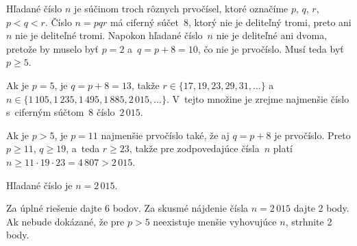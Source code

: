 {%
Hľadané číslo $n$ je súčinom troch rôznych prvočísel, ktoré označíme $p$, $q$, $r$, ${p<q<r}$.
Číslo $n=pqr$ má ciferný súčet~$8$, ktorý nie je deliteľný tromi, preto ani $n$ nie je deliteľné
tromi. Napokon hľadané číslo~$n$ nie je deliteľné ani dvoma, pretože by
muselo byť $p=2$ a~$q=p+8=10$, čo nie je prvočíslo. Musí teda byť $p\ge 5$.

Ak je $p=5$, je $q=p+8=13$, takže $r\in\{17, 19, 23, 29, 31, {\dots}\}$ a~$n\in\{1\,105,\allowbreak
1\,235, 1\,495, 1\,885, 2\,015, {\dots}\}$. V~tejto množine je zrejme najmenšie
číslo s~ciferným súčtom~$8$ číslo~$2\,015$.

Ak je $p>5$, je $p=11$ najmenšie prvočíslo také, že aj $q=p+8$ je prvočíslo. Preto
$p\ge11$, $q\ge19$, a~teda $r\ge23$, takže pre zodpovedajúce čísla~$n$
platí $n\ge11\cdot 19\cdot 23 = 4\,807 > 2\,015$.

Hľadané číslo je $n=2\,015$.


\nobreak\medskip\petit\noindent
Za úplné riešenie dajte 6 bodov. Za skusmé nájdenie čísla $n=2\,015$ dajte 2 body.
Ak nebude dokázané, že pre $p>5$ neexistuje menšie vyhovujúce $n$, strhnite 2 body.

\endpetit
\bigbreak
}

